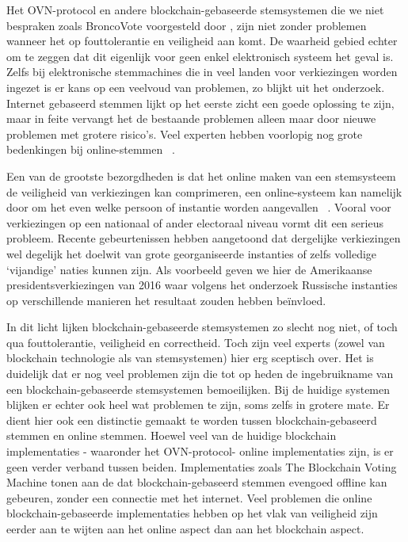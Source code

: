 	 Het OVN-protocol en andere blockchain-gebaseerde stemsystemen die we niet bespraken zoals BroncoVote voorgesteld door , zijn niet zonder problemen wanneer het op fouttolerantie en veiligheid aan komt. De waarheid gebied echter om te zeggen dat dit eigenlijk voor geen enkel elektronisch systeem het geval is. Zelfs bij elektronische stemmachines die  in veel landen voor verkiezingen worden ingezet is er kans op een veelvoud van problemen, zo blijkt uit het \textcite{Norden2015} onderzoek. Internet gebaseerd stemmen lijkt op het eerste zicht een goede oplossing te zijn, maar in feite vervangt het de bestaande problemen alleen maar door nieuwe problemen met grotere risico's. Veel experten hebben voorlopig nog grote bedenkingen bij online-stemmen ~\autocite{Norden2015}. 
	 
	 Een van de grootste bezorgdheden is dat het online maken van een stemsysteem de veiligheid van verkiezingen kan comprimeren, een online-systeem kan namelijk door om het even welke persoon of instantie worden aangevallen ~\autocite{Norden2015}. Vooral voor verkiezingen op een nationaal of ander electoraal niveau vormt dit een serieus probleem. Recente gebeurtenissen hebben aangetoond dat dergelijke verkiezingen wel degelijk het doelwit van grote georganiseerde instanties of zelfs volledige `vijandige' naties kunnen zijn. Als voorbeeld geven we hier de Amerikaanse presidentsverkiezingen van 2016 waar volgens het \textcite{Mueller2019} onderzoek Russische instanties op verschillende manieren het resultaat zouden hebben beïnvloed.
	 
	 In dit licht lijken blockchain-gebaseerde stemsystemen zo slecht nog niet, of toch qua fouttolerantie, veiligheid en correctheid. Toch zijn veel experts (zowel van blockchain technologie als van stemsystemen) hier erg sceptisch over. Het is duidelijk dat er nog veel problemen zijn die tot op heden de ingebruikname van een blockchain-gebaseerde stemsystemen bemoeilijken. Bij de huidige systemen blijken er echter ook heel wat problemen te zijn, soms zelfs in grotere mate. Er dient hier ook een distinctie gemaakt te worden tussen blockchain-gebaseerd stemmen en online stemmen. Hoewel veel van de huidige blockchain implementaties - waaronder het OVN-protocol- online implementaties zijn, is er geen verder verband tussen beiden. Implementaties zoals The Blockchain Voting Machine tonen aan de dat blockchain-gebaseerd stemmen evengoed offline kan gebeuren, zonder een connectie met het internet. Veel problemen die online blockchain-gebaseerde implementaties hebben op het vlak van veiligheid zijn eerder aan te wijten aan het online aspect dan aan het blockchain aspect.
	 
